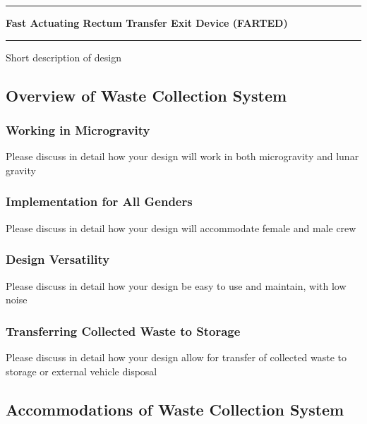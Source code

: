 \pagebreak
\chapter[Fast Actuating Rectum Transfer Exit Device (FARTED)]{}\vspace{-2cm}\noindent\rule{\textwidth}{2.5pt}
\thispagestyle{empty}

\vspace{5cm}\textbf{\huge{Fast Actuating Rectum Transfer Exit Device (FARTED)}}

\medskip\noindent\rule{\textwidth}{1pt}

Short description of design

\pagebreak
\section[Overview of Design]{Overview of Waste Collection System}

    \subsection{Working in Microgravity}
    Please discuss in detail how your design will work in both microgravity and lunar gravity

    \subsection{Implementation for All Genders}
    Please discuss in detail how your design will accommodate female and male crew

    \subsection{Design Versatility}
    Please discuss in detail how your design be easy to use and maintain, with low noise

    \subsection{Transferring Collected Waste to Storage}
    Please discuss in detail how your design allow for transfer of collected waste to storage or external vehicle disposal

\pagebreak
\section[Accommodations]{Accommodations of Waste Collection System}

